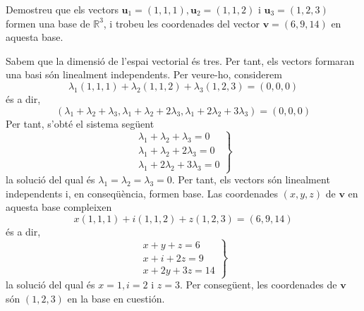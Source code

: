 \begin{exercici}
Demostreu que els vectors $\mathbf{u}_{1}=(1,1,1),\mathbf{u}_{2}=(1,1,2)$ i
$\mathbf{u}_{3}=(1,2,3)$ formen una base de $\mathbb{R}^{3}$, i trobeu
les coordenades del vector $\mathbf{v}=(6,9,14)$ en aquesta base.

\end{exercici}
\begin{solucio}
Sabem que la dimensió de l’espai vectorial és tres. Per tant, els
vectors formaran una basi són linealment independents. Per veure-ho,
considerem%
\begin{equation*}
\lambda _{1}(1,1,1)+\lambda _{2}(1,1,2)+\lambda _{3}(1,2,3)=(0,0,0)
\end{equation*}%
és a dir,%
\begin{equation*}
(\lambda _{1}+\lambda _{2}+\lambda _{3},\lambda _{1}+\lambda _{2}+2\lambda
_{3},\lambda _{1}+2\lambda _{2}+3\lambda _{3})=(0,0,0)
\end{equation*}%
Per tant, s’obté el sistema següent%
\begin{equation*}
\left.
\begin{array}{r}
\lambda _{1}+\lambda _{2}+\lambda _{3}=0 \\
\lambda _{1}+\lambda _{2}+2\lambda _{3}=0 \\
\lambda _{1}+2\lambda _{2}+3\lambda _{3}=0%
\end{array}%
\right\}
\end{equation*}%
la solució del qual és $\lambda _{1}=\lambda _{2}=\lambda _{3}=0$. Per tant,
els vectors són linealment independents i, en conseqüència, formen base.
Las coordenades $(x,y,z)$ de $\mathbf{v}$ en aquesta base compleixen%
\begin{equation*}
x(1,1,1)+i(1,1,2)+z(1,2,3)=(6,9,14)
\end{equation*}%
és a dir,%
\begin{equation*}
\left.
\begin{array}{r}
x+y+z=6 \\
x+i+2z=9 \\
x+2y+3z=14%
\end{array}%
\right\}
\end{equation*}%
la solució del qual és $x=1,i=2$ i $z=3$. Per consegüent, les coordenades de
$\mathbf{v}$ són $(1,2,3)$ en la base en cuestión.
\end{solucio}


